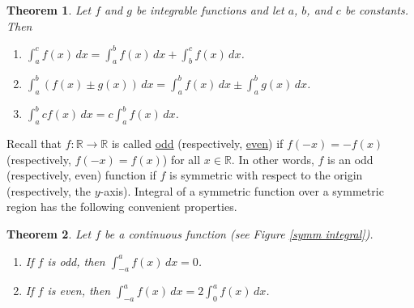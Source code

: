 \documentclass[12pt,letterpaper]{book}
\numberwithin{equation}{section}
\newtheorem{thm}{\textbf{Theorem}}[section]
\theoremstyle{definition}
\begin{document}
\begin{thm}\label{integral properties} Let $f$ and $g$ be integrable functions and let $a$, $b$, and $c$ be constants. Then
\begin{enumerate}
\item $\displaystyle{\int_{a}^cf(x)\,dx=\int_{a}^bf(x)\,dx+\int_{b}^cf(x)\,dx}$.
\item $\displaystyle{\int_{a}^b(f(x)\pm g(x))\,dx=\int_{a}^bf(x)\,dx\pm\int_{a}^bg(x)\,dx}$.
\item $\displaystyle{\int_{a}^bcf(x)\,dx=c\int_{a}^bf(x)\,dx}$.
\end{enumerate}
\end{thm}

Recall that $f:\mathbb{R}\to \mathbb{R}$ is called \underline{odd} (respectively, \underline{even}) if $f(-x)=-f(x)$ (respectively, $f(-x)=f(x)$) for all $x\in \mathbb{R}$. In other words, $f$ is an odd (respectively, even) function if $f$ is symmetric with respect to the origin (respectively, the $y$-axis). Integral of a symmetric function over a symmetric region has the following convenient properties.

\begin{thm} Let $f$ be a continuous function (see Figure \ref{symm integral}).
\begin{enumerate}
\item If $f$ is odd, then $\displaystyle{\int_{-a}^a f(x)\,dx=0}$.
\item If $f$ is even, then $\displaystyle{\int_{-a}^a f(x)\,dx=2\int_{0}^af(x)\,dx}$.
\end{enumerate}
\end{thm}
\end{document}
